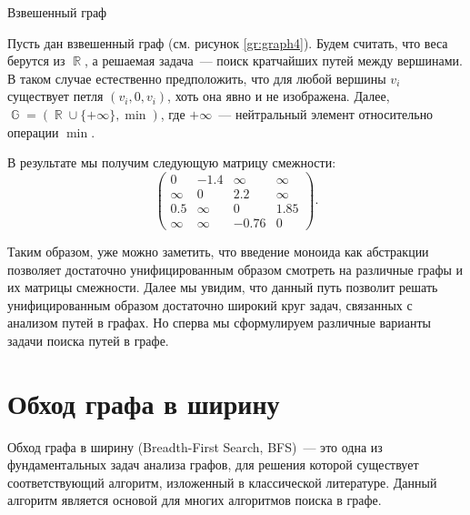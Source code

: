 \begin{marginfigure}
    \caption{Взвешенный граф}
    \label{gr:graph4}
    \begin{center}
        
    \end{center}
\end{marginfigure}
\begin{example}
    \label{example:apspGraph}
    Пусть дан взвешенный граф (см. рисунок \ref{gr:graph4}).
    Будем считать, что веса берутся из $\BbbR$, а решаемая задача~--- поиск кратчайших путей между вершинами.
    В таком случае естественно предположить, что для любой вершины $v_i$ существует петля $(v_i, 0, v_i)$, хоть она явно и не изображена.
    Далее, $\BbbG = (\BbbR \cup \{+\infty\}, \min)$, где $+\infty$~--- нейтральный элемент относительно операции $\min$.

    В результате мы получим следующую матрицу смежности:
    \[
        \begin{pmatrix}
            0      & -1.4   & \infty & \infty \\
            \infty & 0      & 2.2    & \infty \\
            0.5    & \infty & 0      & 1.85   \\
            \infty & \infty & -0.76  & 0
        \end{pmatrix}.
    \]
\end{example}

Таким образом, уже можно заметить, что введение моноида как абстракции позволяет достаточно унифицированным образом смотреть на различные графы и их матрицы смежности.
Далее мы увидим, что данный путь позволит решать унифицированным образом достаточно широкий круг задач, связанных с анализом путей в графах.
Но сперва мы сформулируем различные варианты задачи поиска путей в графе.

\section{Обход графа в ширину}

Обход графа в ширину (Breadth-First Search, BFS)~--- это одна из фундаментальных задач анализа графов, для решения которой существует соответствующий алгоритм, изложенный в классической литературе.
Данный алгоритм является основой для многих алгоритмов поиска в графе.

